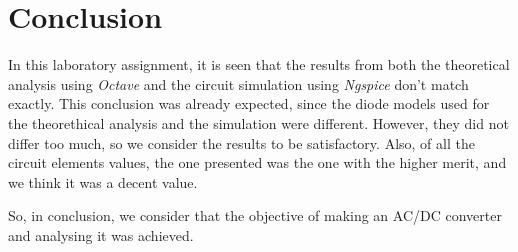 \section{Conclusion}
\label{sec:conclusion}

In this laboratory assignment, it is seen that the results from both the theoretical analysis using \textit{Octave} and the circuit simulation using \textit{Ngspice} don't match exactly. This conclusion was already expected, since the diode models used for the theorethical analysis and the simulation were different. However, they did not differ too much, so we consider the results to be satisfactory. Also, of all the circuit elements values, the one presented was the one with the higher merit, and we think it was a decent value.
\par
So, in conclusion, we consider that the objective of making an AC/DC converter and analysing it was achieved.   
